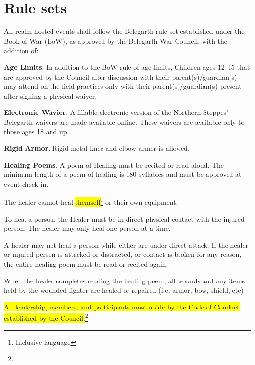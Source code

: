 \documentclass[12pt]{article}
\newcommand{\newpart}[2][]{\hl{#2}\expandafter\ifx\expandafter\relax\detokenize{#1}\relax\else\textnormal{\footnote{#1}}\fi}
\begin{document}
\section{Rule sets}
\begin{level}
    \item All realm-hosted events shall follow the Belegarth rule set established under the Book of War (BoW), as approved by the Belegarth War Council, with the addition of:
    \begin{level}
        \item \textbf{Age Limits}. In addition to the BoW rule of age limits, Children ages 12--15 that are approved by the Council after discussion with their parent(s)/guardian(s) may attend on the field practices only with their parent(s)/guardian(s) present after signing a physical waiver.
        \item \textbf{Electronic Wavier}. A fillable electronic version of the Northern Steppes' Belegarth waivers are made available online. These waivers are available only to those ages 18 and up.
        \item \textbf{Rigid Armor}. Rigid metal knee and elbow armor is allowed.
        \item \textbf{Healing Poems}. A poem of Healing must be recited or read aloud. The minimum length of a poem of healing is 180 syllables and must be approved at event check-in.
        \begin{level}
            \item The healer cannot heal \newpart[Inclusive language]{themself}  or their own equipment.
            \item To heal a person, the Healer must be in direct physical contact with the injured person. The healer may only heal one person at a time.
            \item A healer may not heal a person while either are under direct attack. If the healer or injured person is attacked or distracted, or contact is broken for any reason, the entire healing poem must be read or recited again.
            \item When the healer completes reading the healing poem, all wounds and any items held by the wounded fighter are healed or repaired (i.e. armor, bow, shield, etc)
        \end{level}
    \end{level}
    \item \newpart{All leadership, members, and participants must abide by the Code of Conduct established by the Council.}
\end{level}
\end{document}
